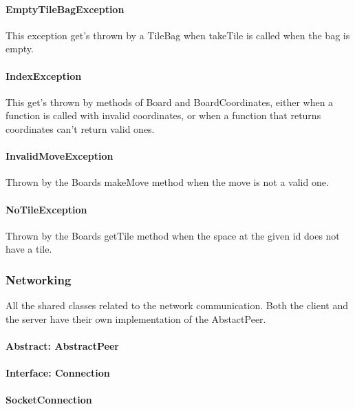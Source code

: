 \documentclass[12pt, letterpaper]{article}
\begin{document}
    \paragraph{EmptyTileBagException}
    This exception get's thrown by a TileBag when takeTile is called when the bag is empty.

    \paragraph{IndexException}
    This get's thrown by methods of Board and BoardCoordinates, either when a function is called with invalid
    coordinates, or when a function that returns coordinates can't return valid ones.

    \paragraph{InvalidMoveException}
    Thrown by the Boards makeMove method when the move is not a valid one.

    \paragraph{NoTileException}
    Thrown by the Boards getTile method when the space at the given id does not have a tile.


    \subsubsection{Networking}

    All the shared classes related to the network communication.
    Both the client and the server have their own implementation of the AbstactPeer.

    \paragraph{Abstract: AbstractPeer}

    \paragraph{Interface: Connection}

    \paragraph{SocketConnection}
\end{document}
